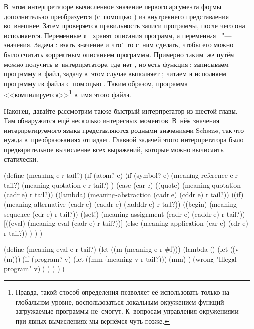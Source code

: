В~этом интерпретаторе вычисленное значение первого аргумента формы 
дополнительно преобразуется (с~помощью ) из внутреннего
представления во~внешнее. Затем проверяется правильность записи программы, после
чего она исполняется. Переменные  и~ хранят описания программ, а
переменная~ "--- значения. Задача : взять значение и
что"~то с~ним сделать, чтобы его можно было считать корректным описанием
программы. Примерно таким~же путём можно получить  в~интерпретаторе,
где нет , но есть функция : записываем программу в~файл,
задачу  в~этом случае выполняет ; читаем и
исполняем программу из файла с~помощью . Таким образом, программа
<<компилируется>>\footnote{Правда, такой способ определения  позволяет
её использовать только на глобальном уровне, воспользоваться локальным
окружением функций загружаемые программы не~смогут. К~вопросам управления
окружениями при явных вычислениях мы вернёмся чуть позже.} в~имя этого файла.

Наконец, давайте рассмотрим также быстрый интерпретатор из шестой главы.
 Там обнаружится ещё несколько интересных моментов. В~нём
значения интерпретируемого языка представляются родными значениями Scheme, так
что нужда в~преобразованиях отпадает. Главной задачей этого интерпретатора было
предварительное вычисление всех выражений, которые можно вычислить статически.

\begin{code:lisp}
(define (meaning e r tail?)
  (if (atom? e)
      (if (symbol? e) (meaning-reference e r tail?)
                      (meaning-quotation e r tail?) )
      (case (car e)
        ((quote)  (meaning-quotation (cadr e) r tail?))
        ((lambda) (meaning-abstraction (cadr e) (cddr e) r tail?))
        ((if)     (meaning-alternative (cadr e) (caddr e) (cadddr e)
                                       r tail?))
        ((begin)  (meaning-sequence (cdr e) r tail?))
        ((set!)   (meaning-assignment (cadr e) (caddr e) r tail?))
        [((eval)   (meaning-eval (cadr e) r tail?))]
        (else     (meaning-application (car e) (cdr e) r tail?)) ) ) )

(define (meaning-eval e r tail?)
  (let ((m (meaning e r #f)))
    (lambda ()
      (let ((v (m)))
        (if (program? v)
            (let ((mm (meaning v r tail?)))
              (mm) )
            (wrong "Illegal program" v) ) ) ) ) )
\end{code:lisp}


